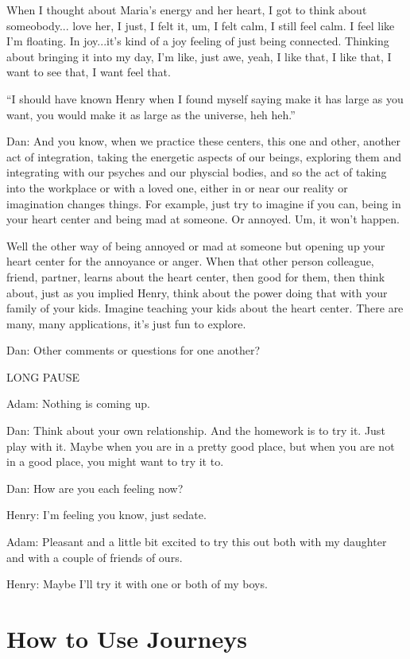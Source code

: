 \documentclass[12pt]{book}
\begin{document}
When I thought about Maria's energy and her heart, I got to think about someobody...
love her, I just,  I felt it, um, I felt calm, I still feel calm. I feel like I'm floating.
In joy...it's kind of a joy feeling of just being connected. Thinking about bringing it
into my day, I'm like, just awe, yeah, I like that, I like that, I want to see that, I want feel that.

``I should have known Henry when I found myself saying make it has large as you want,
you would make it as large as the universe, heh heh.''

Dan: And you know, when we practice these centers, this one and other, another act of integration,
taking the energetic aspects of our beings, exploring them and integrating with our psyches and our physcial bodies,
and so the act of taking into the workplace or with a loved one, either in or near our reality or imagination changes things.
For example, just try to imagine if you can, being in your heart center and being mad at someone. Or annoyed. Um, it won't happen.

Well the other way of being annoyed or mad at someone but opening up your heart center for the annoyance or anger.
When that other person colleague, friend, partner, learns about the heart center, then good for them, then think about,
just as you implied Henry, think about the power doing that with your family of your kids. Imagine teaching your
kids about the heart center. There are many, many applications, it's just fun to explore.

Dan: Other comments or questions for one another?

LONG PAUSE

Adam: Nothing is coming up.

Dan: Think about your own relationship. And the homework is to try it. Just play with it. Maybe when you are in a pretty good place,
but when you are not in a good place, you might want to try it to.

Dan: How are you each feeling now?

Henry: I'm feeling you know, just sedate.

Adam: Pleasant and a little bit excited to try this out both with my daughter and with a couple of friends of ours.

Henry: Maybe I'll try it with one or both of my boys.




\chapter{How to Use Journeys}
\end{document}
